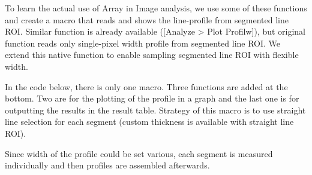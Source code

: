 \documentclass[11pt,a4paper,oneside]{report}
\begin{document}
To learn the actual use of Array in Image analysis, we use some of these functions and 
create a macro that reads and shows the line-profile from segmented line ROI. 
Similar function is already available ([Analyze > Plot Profilw]), 
but original function reads only single-pixel width profile from segmented line ROI. 
We extend this native function to enable sampling segmented line ROI with flexible width.

In the code below, there is only one macro. Three functions are added at the bottom. 
Two are for the plotting of the profile in a graph and the last one is for outputting 
the results in the result table. Strategy of this macro is to use straight line selection 
for each segment (custom thickness is available with straight line ROI). 

Since width of the profile could be set various, each segment is measured individually 
and then profiles are assembled afterwards. 

%

\end{document}
